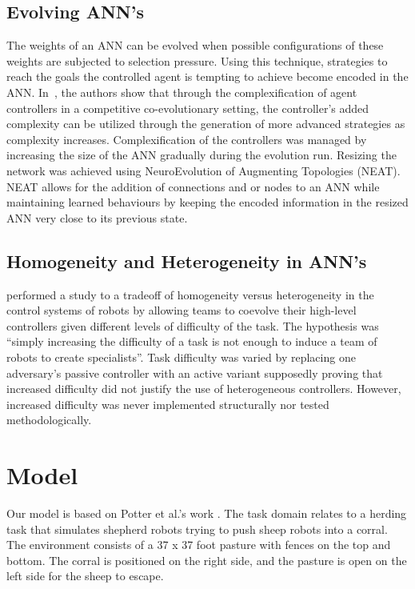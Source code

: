 \documentclass[conference]{IEEEtran}
\begin{document}
\subsection{Evolving ANN's}
The weights of an ANN can be evolved when possible configurations of these weights are subjected to selection pressure.
Using this technique, strategies to reach the goals the controlled agent is tempting to achieve become encoded in the ANN.
In~\cite{stanley2004competitive}, the authors show that through the complexification of agent controllers in a competitive co-evolutionary setting, the controller's added complexity can be utilized through the generation of more advanced strategies as complexity increases. 
Complexification of the controllers was managed by increasing the size of the ANN gradually during the evolution run.
Resizing the network was achieved using NeuroEvolution of Augmenting Topologies (NEAT).
NEAT allows for the addition of connections and or nodes to an ANN while maintaining learned behaviours by keeping the encoded information in the resized ANN very close to its previous state.

\subsection{Homogeneity and Heterogeneity in ANN's}
\cite{potter2001heterogeneity} performed a study to a tradeoff of homogeneity versus heterogeneity in the control systems of robots by allowing teams to coevolve their high-level controllers given different levels of difficulty of the task.
The hypothesis was ``simply increasing the difficulty of a task is not enough to induce a team of robots to create specialists''.
Task difficulty was varied by replacing one adversary's passive controller with an active variant supposedly proving that increased difficulty did not justify the use of heterogeneous controllers.
However, increased difficulty was never implemented structurally nor tested methodologically. 


\section{Model}
Our model is based on Potter et al.'s work \cite{potter2001heterogeneity}. The task domain relates to a herding task that simulates shepherd robots trying to push sheep robots into a corral. The environment consists of a 37 x 37 foot pasture with fences on the top and bottom. The corral is positioned on the right side, and the pasture is open on the left side for the sheep to escape.
\end{document}
